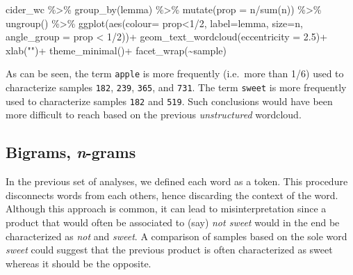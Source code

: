 \documentclass[
]{book}
\newenvironment{Shaded}{\begin{snugshade}}{\end{snugshade}}
\newcommand{\AttributeTok}[1]{\textcolor[rgb]{0.77,0.63,0.00}{#1}}
\newcommand{\DecValTok}[1]{\textcolor[rgb]{0.00,0.00,0.81}{#1}}
\newcommand{\FloatTok}[1]{\textcolor[rgb]{0.00,0.00,0.81}{#1}}
\newcommand{\FunctionTok}[1]{\textcolor[rgb]{0.00,0.00,0.00}{#1}}
\newcommand{\NormalTok}[1]{#1}
\newcommand{\SpecialCharTok}[1]{\textcolor[rgb]{0.00,0.00,0.00}{#1}}
\newcommand{\StringTok}[1]{\textcolor[rgb]{0.31,0.60,0.02}{#1}}
\begin{document}
\begin{Shaded}
\begin{Highlighting}[]
\NormalTok{cider\_wc }\SpecialCharTok{\%\textgreater{}\%} 
  \FunctionTok{group\_by}\NormalTok{(lemma) }\SpecialCharTok{\%\textgreater{}\%} 
  \FunctionTok{mutate}\NormalTok{(}\AttributeTok{prop =}\NormalTok{ n}\SpecialCharTok{/}\FunctionTok{sum}\NormalTok{(n)) }\SpecialCharTok{\%\textgreater{}\%} 
  \FunctionTok{ungroup}\NormalTok{() }\SpecialCharTok{\%\textgreater{}\%} 
  \FunctionTok{ggplot}\NormalTok{(}\FunctionTok{aes}\NormalTok{(}\AttributeTok{colour=}\NormalTok{ prop}\SpecialCharTok{\textless{}}\DecValTok{1}\SpecialCharTok{/}\DecValTok{2}\NormalTok{, }\AttributeTok{label=}\NormalTok{lemma, }\AttributeTok{size=}\NormalTok{n, }\AttributeTok{angle\_group =}\NormalTok{ prop }\SpecialCharTok{\textless{}} \DecValTok{1}\SpecialCharTok{/}\DecValTok{2}\NormalTok{))}\SpecialCharTok{+}
  \FunctionTok{geom\_text\_wordcloud}\NormalTok{(}\AttributeTok{eccentricity =} \FloatTok{2.5}\NormalTok{)}\SpecialCharTok{+}
  \FunctionTok{xlab}\NormalTok{(}\StringTok{""}\NormalTok{)}\SpecialCharTok{+}
  \FunctionTok{theme\_minimal}\NormalTok{()}\SpecialCharTok{+}
  \FunctionTok{facet\_wrap}\NormalTok{(}\SpecialCharTok{\textasciitilde{}}\NormalTok{sample)}
\end{Highlighting}
\end{Shaded}

As can be seen, the term \texttt{apple} is more frequently (i.e.~more than 1/6) used to characterize samples \texttt{182}, \texttt{239}, \texttt{365}, and \texttt{731}. The term \texttt{sweet} is more frequently used to characterize samples \texttt{182} and \texttt{519}. Such conclusions would have been more difficult to reach based on the previous \emph{unstructured} wordcloud.

\hypertarget{bigrams-n-grams}{%
\subsection{\texorpdfstring{Bigrams, \emph{n}-grams}{Bigrams, n-grams}}\label{bigrams-n-grams}}

In the previous set of analyses, we defined each word as a token. This procedure disconnects words from each others, hence discarding the context of the word. Although this approach is common, it can lead to misinterpretation since a product that would often be associated to (say) \emph{not sweet} would in the end be characterized as \emph{not} and \emph{sweet}. A comparison of samples based on the sole word \emph{sweet} could suggest that the previous product is often characterized as sweet whereas it should be the opposite.
\end{document}
